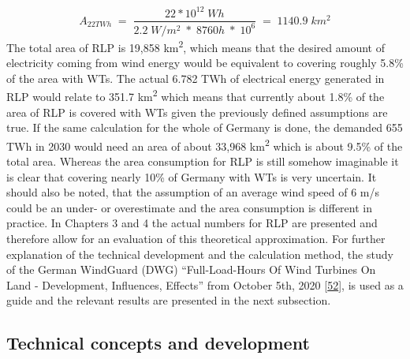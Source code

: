 \documentclass[a4paper,11pt]{article}
\begin{document}
\begin{equation}
A_{22TWh}\;=\;\frac{22 * 10^{12}\; Wh}{2.2\;W/m^2\; *\; 8760h\; *\; 10^6}\;=\;1140.9\;km^2
\end{equation}
The total area of RLP is 19,858 km\textsuperscript{2}, which means that the desired amount of electricity coming from wind energy would be equivalent to covering roughly 5.8\% of the area with WTs. The actual 6.782 TWh of electrical energy generated in RLP would relate to 351.7 km\textsuperscript{2} which means that currently about 1.8\% of the area of RLP is covered with WTs given the previously defined assumptions are true. If the same calculation for the whole of Germany is done, the demanded 655 TWh in 2030 would need an area of about 33,968 km\textsuperscript{2} which is about 9.5\% of the total area. Whereas the area consumption for RLP is still somehow imaginable it is clear that covering nearly 10\% of Germany with WTs is very uncertain. It should also be noted, that the assumption of an average wind speed of 6 m/s could be an under- or overestimate and the area consumption is different in practice. In Chapters 3 and 4 the actual numbers for RLP are presented and therefore allow for an evaluation of this theoretical approximation.
For further explanation of the technical development and the calculation method, the study of the German WindGuard (DWG) ``Full-Load-Hours Of Wind Turbines On Land - Development, Influences, Effects'' from October 5th, 2020 {[}\protect\hyperlink{ref-RasmusBorrmannDr.KnudRehfeldtDr.DennisKruse.2020}{52}{]}, is used as a guide and the relevant results are presented in the next subsection.

\hypertarget{technical-concepts-and-development}{%
\subsection{Technical concepts and development}\label{technical-concepts-and-development}}
\end{document}
